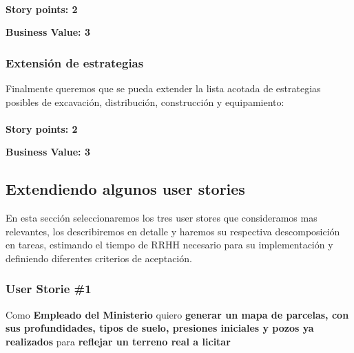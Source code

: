 \documentclass[10pt,a4paper]{article}
\begin{document}
    \\
    
    \textbf{Story points: 2}
    
    \textbf{Business Value: 3}

\subsubsection{Extensión de estrategias}
    Finalmente queremos que se pueda extender la lista acotada de estrategias posibles de excavación, distribución, construcción y equipamiento:\\
    
    \\
    
    \textbf{Story points: 2}
    
    \textbf{Business Value: 3}
    

\subsection{Extendiendo algunos user stories}

En esta sección seleccionaremos los tres user stores que consideramos mas relevantes, los describiremos en detalle y haremos su respectiva descomposición en tareas, estimando el tiempo de RRHH necesario para su implementación y definiendo diferentes criterios de aceptación.

\subsubsection{User Storie \#1}
\begin{framed}
 Como \textbf{Empleado del Ministerio} quiero \textbf{generar un mapa de parcelas, con sus profundidades, tipos de suelo, presiones iniciales y pozos ya realizados} para \textbf{reflejar un terreno real a licitar}
\end{framed}
\end{document}

